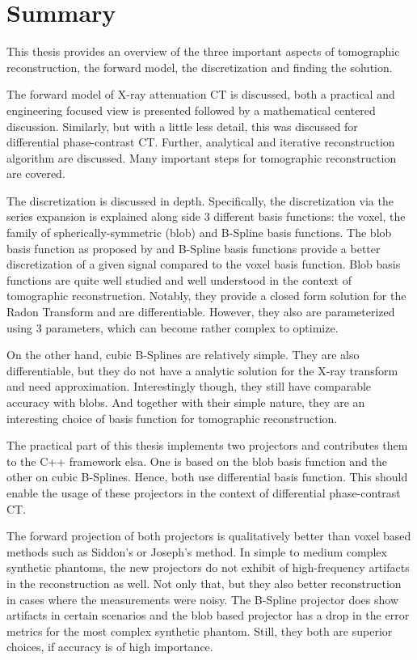 \chapter{Summary}\label{chap:summary}

This thesis provides an overview of the three important aspects of tomographic reconstruction, the
forward model, the discretization and finding the solution.

The forward model of X-ray attenuation CT is discussed, both a practical and engineering focused
view is presented followed by a mathematical centered discussion. Similarly, but with a little less
detail, this was discussed for differential phase-contrast CT\@. Further, analytical and iterative
reconstruction algorithm are discussed. Many important steps for tomographic reconstruction are
covered.

The discretization is discussed in depth. Specifically, the discretization via the series expansion
is explained along side 3 different basis functions: the voxel, the family of spherically-symmetric
(blob) and B-Spline basis functions. The blob basis function as proposed by
\citeauthor*{lewitt_multidimensional_1990} and B-Spline basis functions provide a better
discretization of a given signal compared to the voxel basis function. Blob basis functions are
quite well studied and well understood in the context of tomographic reconstruction. Notably, they
provide a closed form solution for the Radon Transform and are differentiable. However, they also
are parameterized using \(3\) parameters, which can become rather complex to optimize.

On the other hand, cubic B-Splines are relatively simple. They are also differentiable, but they do
not have a analytic solution for the X-ray transform and need approximation. Interestingly though,
they still have comparable accuracy with blobs. And together with their simple nature, they are an
interesting choice of basis function for tomographic reconstruction.

The practical part of this thesis implements two projectors and contributes them to the C++
framework elsa. One is based on the blob basis function and the other on cubic B-Splines. Hence,
both use differential basis function. This should enable the usage of these projectors in the
context of differential phase-contrast CT\@.

The forward projection of both projectors is qualitatively better than voxel based methods such as
Siddon's or Joseph's method. In simple to medium complex synthetic phantoms, the new projectors do
not exhibit of high-frequency artifacts in the reconstruction as well. Not only that, but they also
better reconstruction in cases where the measurements were noisy.  The B-Spline projector does show
artifacts in certain scenarios and the blob based projector has a drop in the error metrics for the
most complex synthetic phantom. Still, they both are superior choices, if accuracy is of high
importance.

